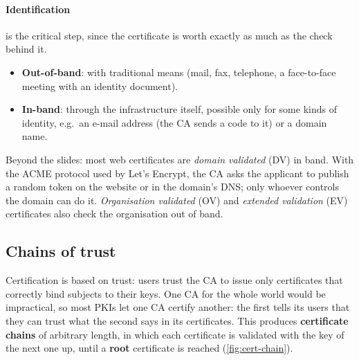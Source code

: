 \paragraph{Identification} is the critical step, since the certificate is worth exactly as much as the check behind it.
\begin{itemize}
    \item \textbf{Out-of-band}: with traditional means (mail, fax, telephone, a face-to-face meeting with an identity document).
    \item \textbf{In-band}: through the infrastructure itself, possible only for some kinds of identity, e.g.\ an e-mail address (the CA sends a code to it) or a domain name.
\end{itemize}
Beyond the slides: most web certificates are \emph{domain validated} (DV) in band. With the ACME protocol used by Let's Encrypt, the CA asks the applicant to publish a random token on the website or in the domain's DNS; only whoever controls the domain can do it. \emph{Organisation validated} (OV) and \emph{extended validation} (EV) certificates also check the organisation out of band.

\subsection{Chains of trust}

Certification is based on trust: users trust the CA to issue only certificates that correctly bind subjects to their keys. One CA for the whole world would be impractical, so most PKIs let one CA certify another: the first tells its users that they can trust what the second says in its certificates. This produces \textbf{certificate chains} of arbitrary length, in which each certificate is validated with the key of the next one up, until a \textbf{root} certificate is reached (\cref{fig:cert-chain}).

